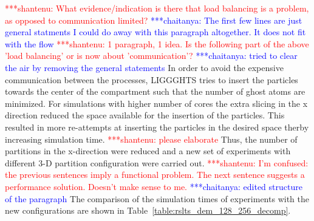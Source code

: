 \documentclass[preprint,11pt,authoryear]{elsarticle}
\newcommand{\jhanote}[1]{ {\textcolor{red} { ***shantenu: #1 }}}
\newcommand{\csnote}[1]{ {\textcolor{blue} { ***chaitanya: #1 }}}
\newcommand{\jhanote}[1]{}
\newcommand{\csnote}[1]{}
\begin{document}
\jhanote{What evidence/indication is there that load balancing is
a problem, as opposed to communication limited?} \csnote{The first few lines 
are  just general statments I could do away with this paragraph altogether. 
It does not fit with the flow} %
\jhanote{1 paragraph, 1 idea. Is the following part of the above 'load balancing' or is 
now about 'communication'?} \csnote{tried to clear the air by removing the general statements}
In order to avoid the expensive communication
between the processes, LIGGGHTS tries to insert the particles towards the
center of the compartment such that the number of ghost atoms are minimized.
For simulations with higher number of cores the extra slicing in the x direction 
reduced the space available for the insertion of the particles.
This resulted in more re-attempts at inserting the particles in the desired space 
therby increasing simulation time.
\jhanote{please elaborate} 
Thus, the number of partitions in the x-direction were reduced and a new set of 
experiments with different 3-D partition configuration were carried out. 
\jhanote{I'm
confused: the previous sentences imply a functional problem. The next sentence
suggests a performance solution. Doesn't make sense to me.} \csnote{edited structure of the paragraph}
The comparison of the simulation times of experiments with the new configurations are shown in
Table~\ref{table:rslts_dem_128_256_decomp}.
\end{document}
